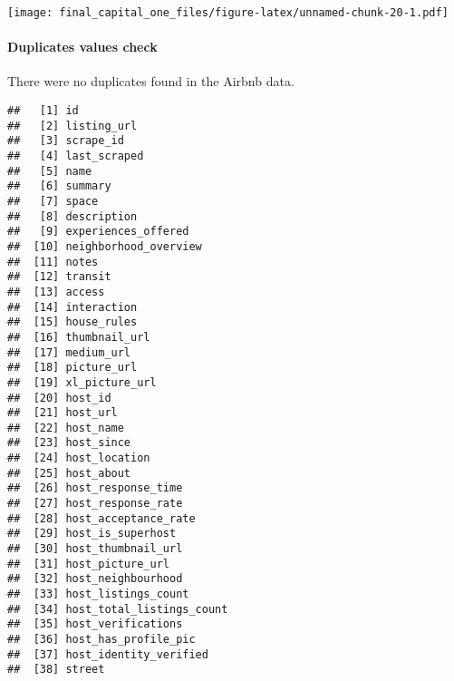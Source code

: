 \documentclass[
]{article}
\begin{document}
\texttt{[image: final\_capital\_one\_files/figure-latex/unnamed-chunk-20-1.pdf]}

\hypertarget{duplicates-values-check-1}{%
\paragraph{Duplicates values check}\label{duplicates-values-check-1}}

There were no duplicates found in the Airbnb data.

\begin{verbatim}
##   [1] id                                          
##   [2] listing_url                                 
##   [3] scrape_id                                   
##   [4] last_scraped                                
##   [5] name                                        
##   [6] summary                                     
##   [7] space                                       
##   [8] description                                 
##   [9] experiences_offered                         
##  [10] neighborhood_overview                       
##  [11] notes                                       
##  [12] transit                                     
##  [13] access                                      
##  [14] interaction                                 
##  [15] house_rules                                 
##  [16] thumbnail_url                               
##  [17] medium_url                                  
##  [18] picture_url                                 
##  [19] xl_picture_url                              
##  [20] host_id                                     
##  [21] host_url                                    
##  [22] host_name                                   
##  [23] host_since                                  
##  [24] host_location                               
##  [25] host_about                                  
##  [26] host_response_time                          
##  [27] host_response_rate                          
##  [28] host_acceptance_rate                        
##  [29] host_is_superhost                           
##  [30] host_thumbnail_url                          
##  [31] host_picture_url                            
##  [32] host_neighbourhood                          
##  [33] host_listings_count                         
##  [34] host_total_listings_count                   
##  [35] host_verifications                          
##  [36] host_has_profile_pic                        
##  [37] host_identity_verified                      
##  [38] street                                      

\end{verbatim}
\end{document}
